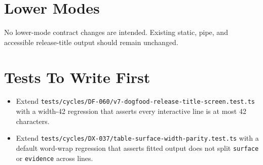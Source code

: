 \section{Lower Modes}\label{record-136-lower-modes}

No lower-mode contract changes are intended. Existing static, pipe, and accessible release-title output should remain unchanged.

\section{Tests To Write First}\label{record-136-tests-to-write-first}

\begin{itemize}
\tightlist
\item
  Extend \texttt{t\allowbreak{}e\allowbreak{}s\allowbreak{}t\allowbreak{}s\allowbreak{}/\allowbreak{}c\allowbreak{}y\allowbreak{}c\allowbreak{}l\allowbreak{}e\allowbreak{}s\allowbreak{}/\allowbreak{}D\allowbreak{}F\allowbreak{}-\allowbreak{}0\allowbreak{}6\allowbreak{}0\allowbreak{}/\allowbreak{}v\allowbreak{}7\allowbreak{}-\allowbreak{}d\allowbreak{}o\allowbreak{}g\allowbreak{}f\allowbreak{}o\allowbreak{}o\allowbreak{}d\allowbreak{}-\allowbreak{}r\allowbreak{}e\allowbreak{}l\allowbreak{}e\allowbreak{}a\allowbreak{}s\allowbreak{}e\allowbreak{}-\allowbreak{}t\allowbreak{}i\allowbreak{}t\allowbreak{}l\allowbreak{}e\allowbreak{}-\allowbreak{}s\allowbreak{}c\allowbreak{}r\allowbreak{}e\allowbreak{}e\allowbreak{}n\allowbreak{}.\allowbreak{}t\allowbreak{}e\allowbreak{}s\allowbreak{}t\allowbreak{}.\allowbreak{}t\allowbreak{}s} with a width-42 regression that asserts every interactive line is at most 42 characters.
\item
  Extend \texttt{t\allowbreak{}e\allowbreak{}s\allowbreak{}t\allowbreak{}s\allowbreak{}/\allowbreak{}c\allowbreak{}y\allowbreak{}c\allowbreak{}l\allowbreak{}e\allowbreak{}s\allowbreak{}/\allowbreak{}D\allowbreak{}X\allowbreak{}-\allowbreak{}0\allowbreak{}3\allowbreak{}7\allowbreak{}/\allowbreak{}t\allowbreak{}a\allowbreak{}b\allowbreak{}l\allowbreak{}e\allowbreak{}-\allowbreak{}s\allowbreak{}u\allowbreak{}r\allowbreak{}f\allowbreak{}a\allowbreak{}c\allowbreak{}e\allowbreak{}-\allowbreak{}w\allowbreak{}i\allowbreak{}d\allowbreak{}t\allowbreak{}h\allowbreak{}-\allowbreak{}p\allowbreak{}a\allowbreak{}r\allowbreak{}i\allowbreak{}t\allowbreak{}y\allowbreak{}.\allowbreak{}t\allowbreak{}e\allowbreak{}s\allowbreak{}t\allowbreak{}.\allowbreak{}t\allowbreak{}s} with a default word-wrap regression that asserts fitted output does not split \texttt{s\allowbreak{}u\allowbreak{}r\allowbreak{}f\allowbreak{}a\allowbreak{}c\allowbreak{}e} or \texttt{e\allowbreak{}v\allowbreak{}i\allowbreak{}d\allowbreak{}e\allowbreak{}n\allowbreak{}c\allowbreak{}e} across lines.
\end{itemize}

